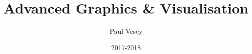 


%
 {
}





\usepackage{eurosym}
\usepackage{graphicx}
\usepackage{wasysym}
\usepackage{listings}
\usepackage{pxfonts}
\usepackage{verbatim}
\usepackage{color}
\usepackage{xcolor}
\usepackage{wrapfig}
\usepackage{hyperref}
\usepackage[nomain, xindy, toc, acronym]{glossaries}



\makeglossaries{}
\usepackage[xindy]{imakeidx}
\makeindex




%

%
%






%
\title[Advanced Graphics \& Visualisation]{Advanced Graphics \& Visualisation}
%
\author{Paul Vesey}
\date{2017-2018}


